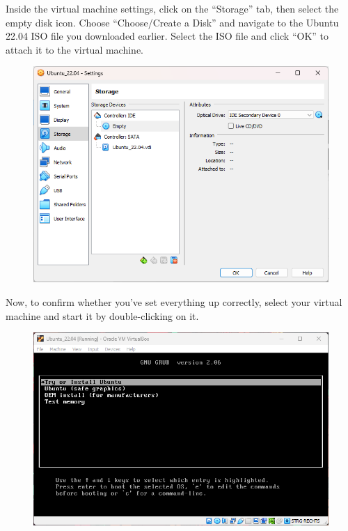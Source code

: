 \documentclass{article}
\begin{document}
\noindent
Inside the virtual machine settings, click on the “Storage” tab, then select the empty disk icon. Choose “Choose/Create a Disk” and navigate to the Ubuntu 22.04 ISO file you downloaded earlier. Select the ISO file and click “OK” to attach it to the virtual machine.

\begin{figure}[H]
    \centering
    \includegraphics[width=\textwidth]{img/2./virtual_box6_english.png}
\end{figure}

\noindent
Now, to confirm whether you've set everything up correctly, select your virtual machine and start it by double-clicking on it.

\begin{figure}[H]
    \centering
    \includegraphics[width=\textwidth]{img/2./virtual_box7_english.png}
\end{figure}
\end{document}

